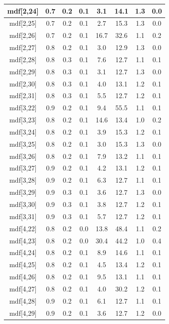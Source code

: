 \begin{longtable}{|c|c|c|c|c|c|c|c|}
\hline
mdf[2,24] & 0.7 & 0.2 & 0.1 & 3.1 & 14.1 & 1.3 & 0.0 \\
\hline
mdf[2,25] & 0.7 & 0.2 & 0.1 & 2.7 & 15.3 & 1.3 & 0.0 \\
\hline
mdf[2,26] & 0.7 & 0.2 & 0.1 & 16.7 & 32.6 & 1.1 & 0.2 \\
\hline
mdf[2,27] & 0.8 & 0.2 & 0.1 & 3.0 & 12.9 & 1.3 & 0.0 \\
\hline
mdf[2,28] & 0.8 & 0.3 & 0.1 & 7.6 & 12.7 & 1.1 & 0.1 \\
\hline
mdf[2,29] & 0.8 & 0.3 & 0.1 & 3.1 & 12.7 & 1.3 & 0.0 \\
\hline
mdf[2,30] & 0.8 & 0.3 & 0.1 & 4.0 & 13.1 & 1.2 & 0.1 \\
\hline
mdf[2,31] & 0.8 & 0.3 & 0.1 & 5.5 & 12.7 & 1.2 & 0.1 \\
\hline
mdf[3,22] & 0.9 & 0.2 & 0.1 & 9.4 & 55.5 & 1.1 & 0.1 \\
\hline
mdf[3,23] & 0.8 & 0.2 & 0.1 & 14.6 & 13.4 & 1.0 & 0.2 \\
\hline
mdf[3,24] & 0.8 & 0.2 & 0.1 & 3.9 & 15.3 & 1.2 & 0.1 \\
\hline
mdf[3,25] & 0.8 & 0.2 & 0.1 & 3.0 & 15.3 & 1.3 & 0.0 \\
\hline
mdf[3,26] & 0.8 & 0.2 & 0.1 & 7.9 & 13.2 & 1.1 & 0.1 \\
\hline
mdf[3,27] & 0.9 & 0.2 & 0.1 & 4.2 & 13.1 & 1.2 & 0.1 \\
\hline
mdf[3,28] & 0.9 & 0.2 & 0.1 & 6.3 & 12.7 & 1.1 & 0.1 \\
\hline
mdf[3,29] & 0.9 & 0.3 & 0.1 & 3.6 & 12.7 & 1.3 & 0.0 \\
\hline
mdf[3,30] & 0.9 & 0.3 & 0.1 & 3.8 & 12.7 & 1.2 & 0.1 \\
\hline
mdf[3,31] & 0.9 & 0.3 & 0.1 & 5.7 & 12.7 & 1.2 & 0.1 \\
\hline
mdf[4,22] & 0.8 & 0.2 & 0.0 & 13.8 & 48.4 & 1.1 & 0.2 \\
\hline
mdf[4,23] & 0.8 & 0.2 & 0.0 & 30.4 & 44.2 & 1.0 & 0.4 \\
\hline
mdf[4,24] & 0.8 & 0.2 & 0.1 & 8.9 & 14.6 & 1.1 & 0.1 \\
\hline
mdf[4,25] & 0.8 & 0.2 & 0.1 & 4.5 & 13.4 & 1.2 & 0.1 \\
\hline
mdf[4,26] & 0.8 & 0.2 & 0.1 & 9.5 & 13.1 & 1.1 & 0.1 \\
\hline
mdf[4,27] & 0.8 & 0.2 & 0.1 & 4.0 & 30.2 & 1.2 & 0.1 \\
\hline
mdf[4,28] & 0.9 & 0.2 & 0.1 & 6.1 & 12.7 & 1.1 & 0.1 \\
\hline
mdf[4,29] & 0.9 & 0.2 & 0.1 & 3.6 & 12.7 & 1.2 & 0.0 \\

\end{longtable}
